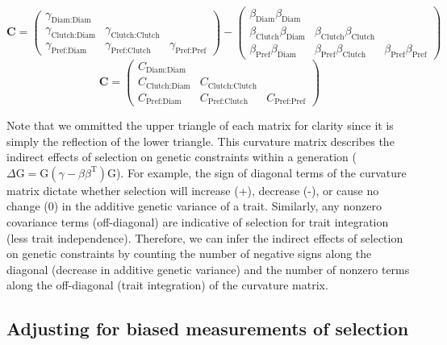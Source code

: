 \documentclass[11pt,]{article}
\begin{document}
\[\textbf{C} = \begin{pmatrix} \gamma_{\text{Diam:Diam}}&& \\ \gamma_{\text{Clutch:Diam}}&\gamma_{\text{Clutch:Clutch}}& \\ \gamma_{\text{Pref:Diam}} & \gamma_{\text{Pref:Clutch}} &\gamma_{\text{Pref:Pref}} \end{pmatrix} - \begin{pmatrix} \beta_{\text{Diam}}\beta_{\text{Diam}}&& \\ \beta_{\text{Clutch}}\beta_{\text{Diam}}&\beta_{\text{Clutch}}\beta_{\text{Clutch}}& \\ \beta_{\text{Pref}}\beta_{\text{Diam}} & \beta_{\text{Pref}}\beta_{\text{Clutch}} &\beta_{\text{Pref}}\beta_{\text{Pref}} \end{pmatrix}\]
\[\textbf{C} = \begin{pmatrix} C_{\text{Diam:Diam}}&& \\ C_{\text{Clutch:Diam}} & C_{\text{Clutch:Clutch}} & \\ C_{\text{Pref:Diam}} & C_{\text{Pref:Clutch}} & C_{\text{Pref:Pref}} \end{pmatrix}\]

Note that we ommitted the upper triangle of each matrix for clarity
since it is simply the reflection of the lower triangle. This curvature
matrix describes the indirect effects of selection on genetic
constraints within a generation
(\(\Delta \text{G}=\text{G}(\gamma -\beta \beta^{\text{T}})\text{G}\)).
For example, the sign of diagonal terms of the curvature matrix dictate
whether selection will increase (+), decrease (-), or cause no change
(0) in the additive genetic variance of a trait. Similarly, any nonzero
covariance terms (off-diagonal) are indicative of selection for trait
integration (less trait independence). Therefore, we can infer the
indirect effects of selection on genetic constraints by counting the
number of negative signs along the diagonal (decrease in additive
genetic variance) and the number of nonzero terms along the off-diagonal
(trait integration) of the curvature matrix.

\subsection{Adjusting for biased measurements of
selection}\label{adjusting-for-biased-measurements-of-selection}
\end{document}
